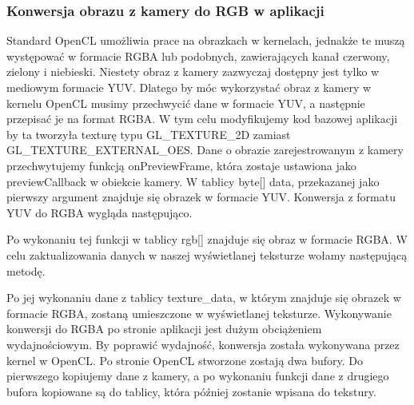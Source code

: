\subsubsection[Konwersja obrazu z kamery do RGB w aplikacji]{Konwersja obrazu z kamery do RGB w aplikacji}
Standard OpenCL umożliwia prace na obrazkach w kernelach, jednakże te muszą występować w formacie RGBA lub podobnych, zawierających kanał czerwony, zielony i niebieski. Niestety obraz z kamery zazwyczaj dostępny jest tylko w mediowym formacie YUV. Dlatego by móc wykorzystać obraz z kamery w kernelu OpenCL musimy przechwycić dane w formacie YUV, a następnie przepisać je na format RGBA. W tym celu modyfikujemy kod bazowej aplikacji by ta tworzyła texturę typu GL\_TEXTURE\_2D zamiast GL\_TEXTURE\_EXTERNAL\_OES. Dane o obrazie zarejestrowanym z kamery przechwytujemy funkcją onPreviewFrame, która zostaje ustawiona jako previewCallback w obiekcie kamery. W tablicy byte[] data, przekazanej jako pierwszy argument znajduje się obrazek w formacie YUV. Konwersja z formatu YUV do RGBA wygląda następująco.
 
Po wykonaniu tej funkcji w tablicy rgb[] znajduje się obraz w formacie RGBA. W celu zaktualizowania danych w naszej wyświetlanej teksturze wołamy następującą metodę. 

Po jej wykonaniu dane z tablicy texture\_data, w którym znajduje się obrazek w formacie RGBA, zostaną umieszczone w wyświetlanej teksturze.
Wykonywanie konwersji do RGBA po stronie aplikacji jest dużym obciążeniem wydajnościowym. By poprawić wydajność, konwersja została wykonywana przez kernel w OpenCL. Po stronie OpenCL stworzone zostają dwa bufory. Do pierwszego kopiujemy dane z kamery, a po wykonaniu funkcji dane z drugiego bufora kopiowane są do tablicy, która później zostanie wpisana do tekstury.

